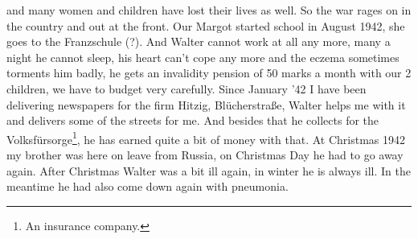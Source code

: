 \documentclass[a5paper,11pt,openany]{book}
\newcommand{\seite}[1]{\leavevmode\marginpar{\footnotesize\itshape\raggedright #1}\ignorespaces}
\begin{document}
  and many women and children have lost their lives as well.
So the war rages on in the country and out at the front.
Our Margot started school in August 1942, she goes to the Franzschule (?).
And Walter cannot work at all any more, many a night he cannot sleep,
  his heart can't cope any more and the eczema sometimes torments him badly, he gets
\seite{57}
an invalidity pension of 50 marks a month with our 2 children, we have to budget very carefully.
Since January '42 I have been delivering newspapers for the firm Hitzig,
  Blücherstraße, Walter helps me with it and delivers some of the streets for me.
And besides that he collects for the Volksfürsorge\footnote{An insurance company.}, he has earned quite a bit of money with that.
At Christmas 1942 my brother was here on leave from Russia, on Christmas Day he had to go away again.
After Christmas Walter was a bit ill again, in winter he is always ill.
In the meantime he had also come down again with
\seite{58}
pneumonia.
\end{document}
